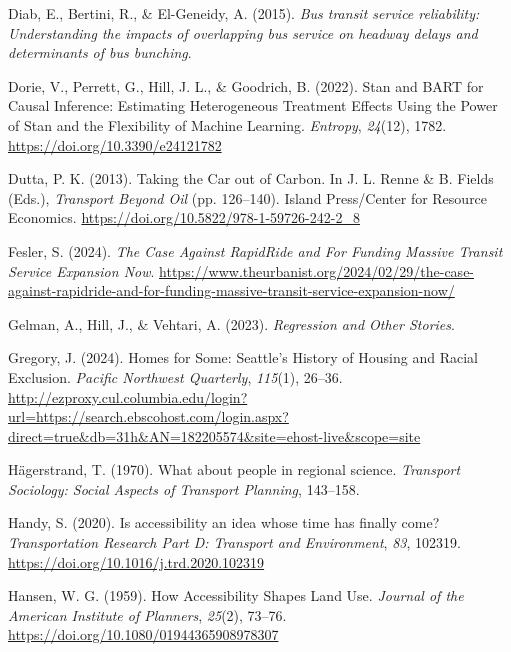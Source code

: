 \documentclass[
  12pt,
]{article}
\newlength{\cslhangindent}
\newenvironment{CSLReferences}[2] %
 {\begin{list}{}{%
  \setlength{\itemindent}{0pt}
  \setlength{\leftmargin}{0pt}
  \setlength{\parsep}{0pt}
  \ifodd #1
   \setlength{\leftmargin}{\cslhangindent}
   \setlength{\itemindent}{-1\cslhangindent}
  \fi
  \setlength{\itemsep}{#2\baselineskip}}}
 {\end{list}}
\begin{document}
\begin{CSLReferences}{1}{0}
Diab, E., Bertini, R., \& El-Geneidy, A. (2015). \emph{Bus transit
service reliability: {Understanding} the impacts of overlapping bus
service on headway delays and determinants of bus bunching}.

Dorie, V., Perrett, G., Hill, J. L., \& Goodrich, B. (2022). Stan and
{BART} for {Causal} {Inference}: {Estimating} {Heterogeneous}
{Treatment} {Effects} {Using} the {Power} of {Stan} and the
{Flexibility} of {Machine} {Learning}. \emph{Entropy}, \emph{24}(12),
1782. \url{https://doi.org/10.3390/e24121782}

Dutta, P. K. (2013). Taking the {Car} out of {Carbon}. In J. L. Renne \&
B. Fields (Eds.), \emph{Transport {Beyond} {Oil}} (pp. 126--140). Island
Press/Center for Resource Economics.
\url{https://doi.org/10.5822/978-1-59726-242-2_8}

Fesler, S. (2024). \emph{The {Case} {Against} {RapidRide} and {For}
{Funding} {Massive} {Transit} {Service} {Expansion} {Now}}.
\url{https://www.theurbanist.org/2024/02/29/the-case-against-rapidride-and-for-funding-massive-transit-service-expansion-now/}

Gelman, A., Hill, J., \& Vehtari, A. (2023). \emph{Regression and
{Other} {Stories}}.

Gregory, J. (2024). Homes for {Some}: {Seattle}'s {History} of {Housing}
and {Racial} {Exclusion}. \emph{Pacific Northwest Quarterly},
\emph{115}(1), 26--36.
\url{http://ezproxy.cul.columbia.edu/login?url=https://search.ebscohost.com/login.aspx?direct=true&db=31h&AN=182205574&site=ehost-live&scope=site}

Hägerstrand, T. (1970). What about people in regional science.
\emph{Transport Sociology: Social Aspects of Transport Planning},
143--158.

Handy, S. (2020). Is accessibility an idea whose time has finally come?
\emph{Transportation Research Part D: Transport and Environment},
\emph{83}, 102319. \url{https://doi.org/10.1016/j.trd.2020.102319}

Hansen, W. G. (1959). How {Accessibility} {Shapes} {Land} {Use}.
\emph{Journal of the American Institute of Planners}, \emph{25}(2),
73--76. \url{https://doi.org/10.1080/01944365908978307}


\end{CSLReferences}
\end{document}
